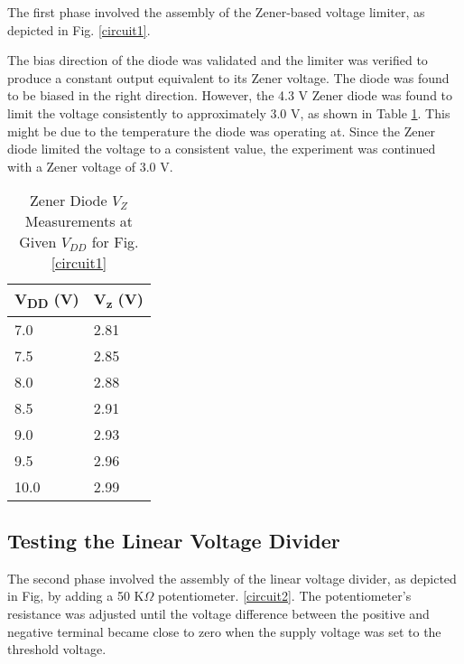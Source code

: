 \documentclass[conference]{IEEEtran}
\begin{document}
The first phase involved the assembly of the Zener-based voltage limiter, as depicted in Fig. \ref{circuit1}.


The bias direction of the diode was validated and the limiter was verified to produce a constant output equivalent to its Zener voltage. The diode was found to be biased in the right direction. However, the 4.3 V Zener diode was found to limit the voltage consistently to approximately 3.0 V, as shown in Table \ref{tab1}. This might be due to the temperature the diode was operating at. Since the Zener diode limited the voltage to a consistent value, the experiment was continued with a Zener voltage of 3.0 V.

\begin{table}[htbp]
\caption{Zener Diode $V_Z$ Measurements at Given $V_{DD}$ for Fig. \ref{circuit1}}
\begin{center}
\begin{tabular}{|p{}|p{}|}
\hline
\textbf{V\textsubscript{DD} (V)}&\textbf{V\textsubscript{z} (V)} \\
\hline
7.0 & 2.81 \\ \hline
7.5 & 2.85 \\ \hline
8.0 & 2.88 \\ \hline
8.5 & 2.91 \\ \hline
9.0 & 2.93 \\ \hline
9.5 & 2.96 \\ \hline
10.0 & 2.99 \\ \hline
\end{tabular}
\label{tab1}
\end{center}
\end{table}

\subsection{Testing the Linear Voltage Divider}

The second phase involved the assembly of the linear voltage divider, as depicted in Fig, by adding a 50 K$\Omega$ potentiometer. \ref{circuit2}. The potentiometer's resistance was adjusted until the voltage difference between the positive and negative terminal became close to zero when the supply voltage was set to the threshold voltage.
\end{document}
